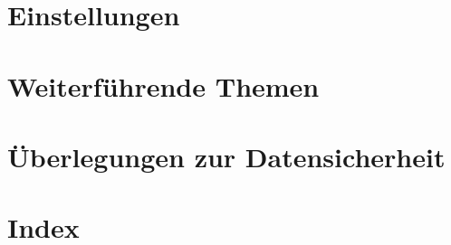 \documentclass[paper=a4,BCOR8.25mm,twoside]{scrbook}
\begin{document}
\chapter{Einstellungen}
	

\chapter{Weiterführende Themen}
    

\chapter{Überlegungen zur Datensicherheit}	
	

\chapter{Index}
\printindex
\end{document}
